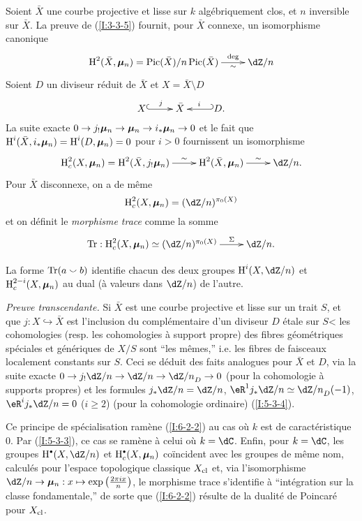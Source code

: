 \subsubsection{}\label{I:6-2-1}

Soient $\bar X$ une courbe projective et lisse sur $k$ algébriquement clos, et 
$n$ inversible sur $\bar X$. La preuve de (\ref{I:3-3-5}) fournit, pour 
$\bar X$ connexe, un isomorphisme canonique 
\[\xymatrix{
  \h^2(\bar X,\dmu_n) = \pic(\bar X)/n\pic(\bar X) \ar[r]^-{\deg}_-{\sim}
    & \dZ/n
}\]
Soient $D$ un diviseur réduit de $\bar X$ et $X=\bar X\setminus D$ 
\[\xymatrix{
  X \ar@{^{(}->}[r]^-j 
    & \bar X 
    & \ar@{_{(}->}[l]_-i D \text{.}
}\]
La suite exacte $0\to j_! {\bm\mu}_n \to {\bm\mu}_n\to i_* {\bm\mu}_n\to 0$ et le fait que 
$\operatorname{H}^i(\bar X,i_*{\bm\mu}_n) = \operatorname{H}^i(D,{\bm\mu}_n)=0$ pour $i>0$ fournissent un 
isomorphisme 
\[\xymatrix{
  \h_c^2(X,\dmu_n) = \h^2(\bar X,j_! \dmu_n) \ar[r]^-\sim 
    & \h^2(\bar X,\dmu_n) \ar[r]^-\sim 
    & \dZ/n \text{.}
}\]
Pour $\bar X$ disconnexe, on a de même 
\[
  \h_c^2(X,\dmu_n) = (\dZ/n)^{\pi_0(X)}
\]
et on définit le \emph{morphisme trace} comme la somme 
\[\xymatrix{
  \tr : \h_c^2(X,\dmu_n) \simeq (\dZ/n)^{\pi_0(X)} \ar[r]^-\Sigma
    & \dZ/n\text{.}
}\]





\begin{theorem}\label{I:6-2-2}
La forme $\operatorname{Tr}(a\smallsmile b)$ identifie chacun des deux groupes $\h^i(X,\dZ/n)$ 
et $\operatorname{H}_c^{2-i}(X,{\bm\mu}_n)$ au dual (à valeurs dans $\dZ/n$) de l'autre. 
\end{theorem}

\emph{Preuve transcendante.} Si $\bar X$ est une courbe projective et lisse sur 
un trait $S$, et que $j:X\hookrightarrow \bar X$ est l'inclusion du 
complémentaire d'un diviseur $D$ étale sur $S$< les cohomologies (resp. 
les cohomologies à support propre) des fibres géométriques spéciales et 
génériques de $X/S$ sont ``les mêmes,'' i.e. les fibres de faisceaux 
localement constants sur $S$. Ceci se déduit des faits analogues pour 
$\bar X$ et $D$, via la suite exacte $0\to j_! \dZ/n\to\dZ/n\to {\dZ/n}_D\to 0$ 
(pour la cohomologie à supports propres) et les formules $j_*\dZ/n = \dZ/n$, 
$\eR^1 j_* \dZ/n \simeq {\dZ/n}_D(-1)$, $\eR^i j_*\dZ/n = 0$ ($i\geqslant 2$) 
(pour la cohomologie ordinaire) (\ref{I:5-3-4}). 

Ce principe de spécialisation ramène (\ref{I:6-2-2}) au cas où $k$ est de 
caractéristique $0$. Par (\ref{I:5-3-3}), ce cas se ramène à celui où 
$k=\dC$. Enfin, pour $k=\dC$, les groupes $\h^\bullet(X,\dZ/n)$ et 
$\h_c^\bullet(X,\dmu_n)$ coïncident avec les groupes de même nom, calculés 
pour l'espace topologique classique $X_{\textnormal{cl}}$ et, via 
l'isomorphisme $\dZ/n\to \dmu_n: x\mapsto \exp\left(\frac{2\pi i x}{n}\right)$, 
le morphisme trace s'identifie à ``intégration sur la classe fondamentale,'' 
de sorte que (\ref{I:6-2-2}) résulte de la dualité de Poincaré pour 
$X_{\textnormal{cl}}$. 





